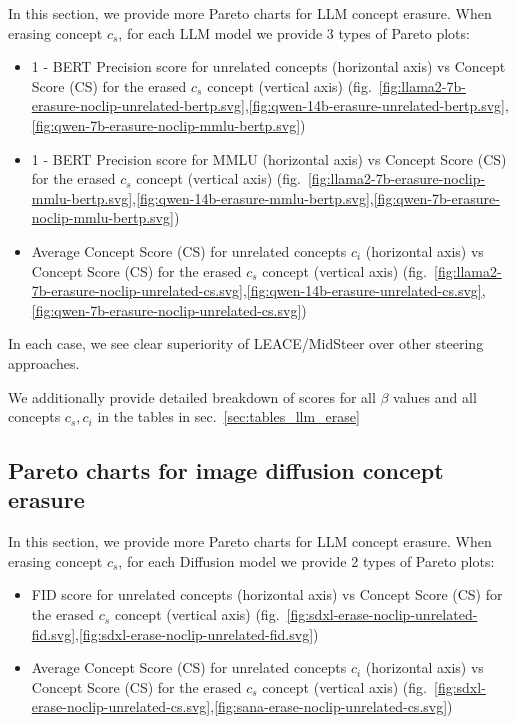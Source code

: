 In this section, we provide more Pareto charts for LLM concept erasure. When erasing concept $c_s$, for each LLM model we provide 3 types of Pareto plots: 
\begin{itemize}
    \item 1 - BERT Precision score for unrelated concepts (horizontal axis) vs Concept Score (CS) for the erased $c_s$ concept (vertical axis) (fig.~\ref{fig:llama2-7b-erasure-noclip-unrelated-bertp.svg},\ref{fig:qwen-14b-erasure-unrelated-bertp.svg},\ref{fig:qwen-7b-erasure-noclip-mmlu-bertp.svg})
    \item 1 - BERT Precision score for MMLU (horizontal axis) vs Concept Score (CS) for the erased $c_s$ concept (vertical axis) (fig.~\ref{fig:llama2-7b-erasure-noclip-mmlu-bertp.svg},\ref{fig:qwen-14b-erasure-mmlu-bertp.svg},\ref{fig:qwen-7b-erasure-noclip-mmlu-bertp.svg})
    \item Average Concept Score (CS) for unrelated concepts $c_i$ (horizontal axis) vs Concept Score (CS) for the erased $c_s$ concept (vertical axis)  (fig.~\ref{fig:llama2-7b-erasure-noclip-unrelated-cs.svg},\ref{fig:qwen-14b-erasure-unrelated-cs.svg},\ref{fig:qwen-7b-erasure-noclip-unrelated-cs.svg})
\end{itemize}

In each case, we see clear superiority of LEACE/MidSteer over other steering approaches.

We additionally provide detailed breakdown of scores for all $\beta$ values and all concepts $c_s, c_i$ in the tables in sec.~\ref{sec:tables_llm_erase}



\clearpage
\subsection{Pareto charts for image diffusion concept erasure}
\label{sec:pareto_diffusion_erase}

In this section, we provide more Pareto charts for LLM concept erasure. When erasing concept $c_s$, for each Diffusion model we provide 2 types of Pareto plots: 
\begin{itemize}
    \item FID score for unrelated concepts (horizontal axis) vs Concept Score (CS) for the erased $c_s$ concept (vertical axis) (fig.~\ref{fig:sdxl-erase-noclip-unrelated-fid.svg},\ref{fig:sdxl-erase-noclip-unrelated-fid.svg})
    \item Average Concept Score (CS) for unrelated concepts $c_i$ (horizontal axis) vs Concept Score (CS) for the erased $c_s$ concept (vertical axis)  (fig.~\ref{fig:sdxl-erase-noclip-unrelated-cs.svg},\ref{fig:sana-erase-noclip-unrelated-cs.svg})
\end{itemize}

